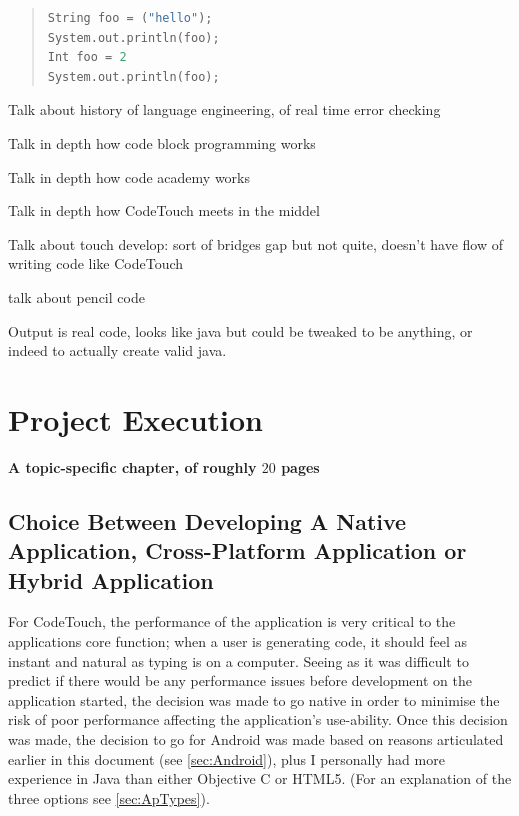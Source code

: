 \documentclass[ %
                    author={Jonathan Rankin},
                supervisor={Dr. David May, Dr. Ian Holyer},
                    degree={MEng},
                     title={CodeTouch},
                  subtitle={A Revolutionary Way To Program Real Code On Touch Screen Devices},
                      type={enterprise},
                      year={2015 } ]{dissertation}
\begin{document}
\begin{quote}
\begin{lstlisting}[caption={Example Java code},label={lst:java},language=Python]
String foo = ("hello");
System.out.println(foo);
Int foo = 2
System.out.println(foo);
\end{lstlisting}
\label{lst:label}
\end{quote}


Talk about history of language engineering, of real time error checking


Talk in depth how code block programming works

Talk in depth how code academy works

Talk in depth how CodeTouch meets in the middel

Talk about touch develop: sort of bridges gap but not quite, doesn't have flow of writing code like CodeTouch

talk about pencil code

Output is real code, looks like java but could be tweaked to be anything, or indeed to actually create valid java.



\chapter{Project Execution}
\label{chap:execution}

{\bf A topic-specific chapter, of roughly $20$ pages} 
\vspace{1cm} 



\section{Choice Between Developing A Native Application, Cross-Platform Application or Hybrid Application}
For CodeTouch, the performance of the application is very critical to the applications core function; when a user is generating code, it should feel as instant and natural as typing is on a computer. Seeing as it was difficult to predict if there would be any performance issues before development on the application started, the decision was made to go native in order to minimise the risk of poor performance affecting the application's use-ability. Once this decision was made, the decision to go for Android was made based on reasons articulated earlier in this document (see \ref{sec:Android}), plus I personally had more experience in Java than either Objective C or HTML5. (For an explanation of the three options see \ref{sec:ApTypes}).
\end{document}
